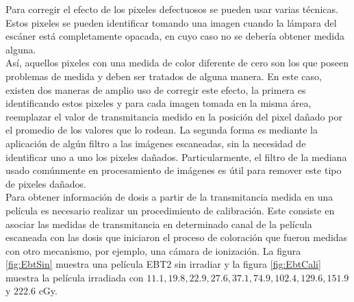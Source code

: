 Para corregir el efecto de los pixeles defectuosos se pueden usar varias técnicas. Estos pixeles se pueden identificar tomando una imagen cuando la lámpara del escáner está completamente opacada, en cuyo caso no se debería obtener medida alguna.\\

Así, aquellos pixeles con una medida de color diferente de cero son los que poseen problemas de medida y deben ser tratados de alguna manera. En este caso, existen dos maneras de amplio uso de corregir este efecto, la primera es identificando estos pixeles y para cada imagen tomada en la misma área, reemplazar el valor de transmitancia medido en la posición del pixel dañado por el promedio de los valores que lo rodean. La segunda forma es mediante la aplicación de algún filtro a las imágenes escaneadas, sin la necesidad de identificar uno a uno los pixeles dañados. Particularmente, el filtro de la mediana usado comúnmente en procesamiento de imágenes es útil para remover este tipo de pixeles dañados.\\ 

Para obtener información de dosis a partir de la transmitancia medida en una película es necesario realizar un procedimiento de calibración. Este consiste en asociar las medidas de transmitancia en determinado canal de la película escaneada con las dosis que iniciaron el proceso de coloración que fueron medidas con otro mecanismo, por ejemplo, una cámara de ionización. La figura \ref{fig:EbtSin} muestra una película EBT2 sin irradiar y la figura \ref{fig:EbtCali} muestra la película irradiada con $11.1 ,  19.8, 22.9, 27.6, 37.1, 74.9, 102.4, 129.6, 151.9$ y $222.6 $ cGy.\\

